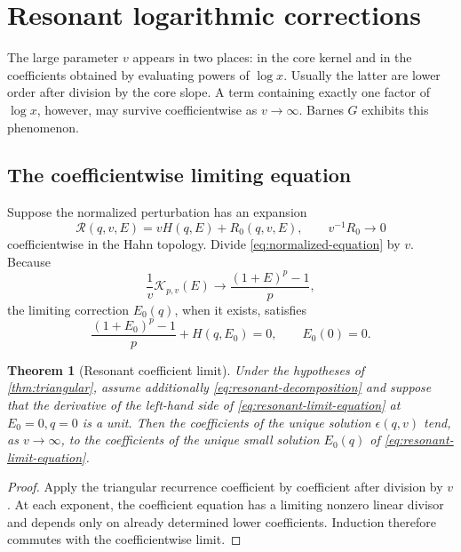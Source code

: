\documentclass[11pt,oneside]{article}
\theoremstyle{plain}
\newtheorem{theorem}{Theorem}[section]
\theoremstyle{definition}
\theoremstyle{remark}
\newcommand{\Rcal}{\mathcal{R}}
\newcommand{\Kcal}{\mathcal{K}}
\begin{document}
\section{Resonant logarithmic corrections}
\label{sec:resonance}

The large parameter \(v\) appears in two places: in the core kernel and in the
coefficients obtained by evaluating powers of \(\log x\).  Usually the latter
are lower order after division by the core slope.  A term containing exactly
one factor of \(\log x\), however, may survive coefficientwise as
\(v\to\infty\).  Barnes \(G\) exhibits this phenomenon.

\subsection{The coefficientwise limiting equation}

Suppose the normalized perturbation has an expansion
\begin{equation}
 \Rcal(q,v,E)=vH(q,E)+R_0(q,v,E),
 \qquad v^{-1}R_0\longrightarrow0
 \label{eq:resonant-decomposition}
\end{equation}
coefficientwise in the Hahn topology.  Divide
\cref{eq:normalized-equation} by \(v\).  Because
\begin{equation}
 \frac{1}{v}\Kcal_{p,v}(E)
 \longrightarrow \frac{(1+E)^p-1}{p},
 \label{eq:kernel-v-limit}
\end{equation}
the limiting correction \(E_0(q)\), when it exists, satisfies
\begin{equation}
 \frac{(1+E_0)^p-1}{p}+H(q,E_0)=0,
 \qquad E_0(0)=0.
 \label{eq:resonant-limit-equation}
\end{equation}

\begin{theorem}[Resonant coefficient limit]
\label{thm:resonant-limit}
Under the hypotheses of \cref{thm:triangular}, assume additionally
\cref{eq:resonant-decomposition} and suppose that the derivative of the
left-hand side of \cref{eq:resonant-limit-equation} at \(E_0=0,q=0\) is a
unit.  Then the coefficients of the unique solution \(\epsilon(q,v)\) tend,
as \(v\to\infty\), to the coefficients of the unique small solution
\(E_0(q)\) of \cref{eq:resonant-limit-equation}.
\end{theorem}

\begin{proof}
Apply the triangular recurrence coefficient by coefficient after division by
\(v\).  At each exponent, the coefficient equation has a limiting nonzero
linear divisor and depends only on already determined lower coefficients.
Induction therefore commutes with the coefficientwise limit.
\end{proof}
\end{document}
